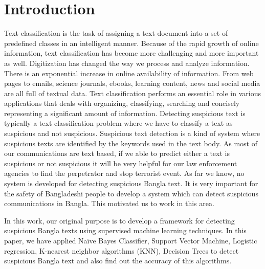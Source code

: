\section{\textbf{Introduction}}
Text classification is the task of assigning a text document into a set of predefined classes in an intelligent manner. Because of the rapid growth of online information, text classification has become more challenging and more important as well. Digitization has changed
the way we process and analyze information. There is an exponential increase in online availability of information. From web pages to emails, science journals, ebooks, learning content, news and social media are all full of textual data. Text classification performs an essential role in various applications that deals with organizing, classifying, searching and concisely representing a significant amount of information. Detecting suspicious text is typically a text classification problem where we have to classify a text as suspicious and not suspicious. Suspicious text detection is a kind of system where suspicious texts are identified by the keywords used in the text body. As most of our communications are text based, if we able to predict either a text is suspicious or not suspicious it will be very helpful for our law enforcement agencies to find the perpetrator and stop terrorist event. As far we know, no system is developed for detecting suspicious Bangla text. It is very important for the safety of Bangladeshi people to develop a system which can detect suspicious communications in Bangla. This motivated us to work in this area.

In this work, our original purpose is to develop a framework for detecting suspicious Bangla texts using supervised machine learning techniques. In this paper, we have applied Naïve Bayes Classifier\cite{yoo2015classification}, Support Vector Machine\cite{wei2012text, villmann2017can}, Logistic regression\cite{sharma2015active}, K-nearest neighbor algorithms (KNN)\cite{harisinghaney2014text}, Decision Trees\cite{chavan2014survey} to detect suspicious Bangla text and also find out the accuracy of this algorithms.